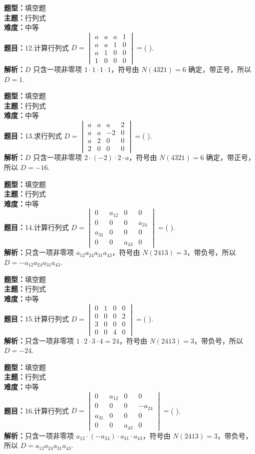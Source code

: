 \documentclass{ctexart}
\newenvironment{question}[5]{%
	\noindent\textbf{题型：}#1\\
	\textbf{主题：}#2\\
	\textbf{难度：}#3\\
	\textbf{题目：}#4\\
	\textbf{解析：}#5\\
	\vspace{1em}
}{}
\begin{document}
	\begin{question}
		{填空题}
		{行列式}
		{中等}
		{12.计算行列式 \(D=\begin{vmatrix}a & a & a & 1 \\ a & a & 1 & 0 \\ a & 1 & 0 & 0 \\ 1 & 0 & 0 & 0\end{vmatrix}=\)(  ).}
		{\(D\) 只含一项非零项 \(1 \cdot 1 \cdot 1 \cdot 1\)，符号由 \(N(4321)=6\) 确定，带正号，所以 \(D=1\).}
	\end{question}
	
	\begin{question}
		{填空题}
		{行列式}
		{中等}
		{13.求行列式 \(D=\begin{vmatrix}a & a & a & 2 \\ a & a & -2 & 0 \\ a & 2 & 0 & 0 \\ 2 & 0 & 0 & 0\end{vmatrix}=\)(  ).}
		{\(D\) 只含一项非零项 \(2 \cdot (-2) \cdot 2 \cdot a\)，符号由 \(N(4321)=6\) 确定，带正号，所以 \(D=-16\).}
	\end{question}
	
	\begin{question}
		{填空题}
		{行列式}
		{中等}
		{14.计算行列式 \(D=\begin{vmatrix}0 & a_{12} & 0 & 0 \\ 0 & 0 & 0 & a_{24} \\ a_{31} & 0 & 0 & 0 \\ 0 & 0 & a_{43} & 0\end{vmatrix}=\)(  ).}
		{只含一项非零项 \(a_{12} a_{24} a_{31} a_{43}\)，符号由 \(N(2413)=3\)，带负号，所以 \(D=-a_{12} a_{24} a_{31} a_{43}\).}
	\end{question}
	
	\begin{question}
		{填空题}
		{行列式}
		{中等}
		{15.计算行列式 \(D=\begin{vmatrix}0 & 1 & 0 & 0 \\ 0 & 0 & 0 & 2 \\ 3 & 0 & 0 & 0 \\ 0 & 0 & 4 & 0\end{vmatrix}=\)(  ).}
		{只含一项非零项 \(1 \cdot 2 \cdot 3 \cdot 4=24\)，符号由 \(N(2413)=3\)，带负号，所以 \(D=-24\).}
	\end{question}
	
	\begin{question}
		{填空题}
		{行列式}
		{中等}
		{16.计算行列式 \(D=\begin{vmatrix}0 & a_{12} & 0 & 0 \\ 0 & 0 & 0 & -a_{24} \\ a_{31} & 0 & 0 & 0 \\ 0 & 0 & a_{43} & 0\end{vmatrix}=\)(  ).}
		{只含一项非零项 \(a_{12} \cdot (-a_{24}) \cdot a_{31} \cdot a_{43}\)，符号由 \(N(2413)=3\)，带负号，所以 \(D=a_{12} a_{24} a_{31} a_{43}\).}
	\end{question}
	
\end{document}

